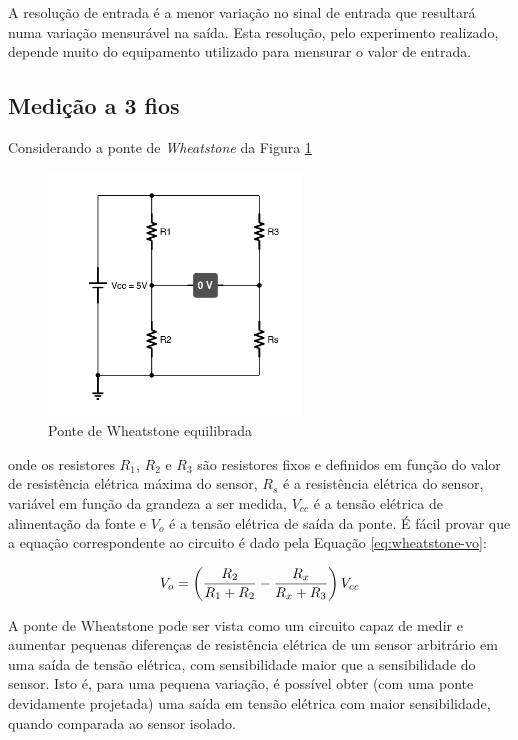 \documentclass[a4paper]{instrumentacao}
\begin{document}
A resolução de entrada é a menor variação no sinal de entrada que resultará numa variação mensurável na saída.  Esta resolução, pelo experimento realizado, depende muito do equipamento utilizado para mensurar o valor de entrada.


\subsection{Medição a 3 fios}

Considerando a ponte de \textit{Wheatstone} da Figura \ref{fig:3fios-wheatstone}

\begin{figure}[H]
\centering
\includegraphics[width=0.6\textwidth]{Wheatstone-Bridge.pdf}
\caption{Ponte de Wheatstone equilibrada}
\label{fig:3fios-wheatstone}
\end{figure}

\noindent onde os resistores $R_1$, $R_2$ e $R_3$ são resistores fixos e definidos em função do valor de resistência elétrica máxima do sensor, $R_s$ é a resistência elétrica do sensor, variável em função da grandeza a ser medida, $V_{cc}$ é a tensão elétrica de alimentação da fonte e $V_o$ é a tensão elétrica de saída da ponte. É fácil provar que a equação correspondente ao circuito é dado pela Equação \ref{eq:wheatstone-vo}:

\begin{equation}
	V_o = \left({{R_2}\over{R_1 + R_2}} - {{R_x}\over{R_x + R_3}}\right)V_{cc}
	\label{eq:wheatstone-vo}
\end{equation}

A ponte de Wheatstone pode ser vista como um circuito capaz de medir e aumentar pequenas diferenças de resistência elétrica de um sensor arbitrário em uma saída de tensão elétrica, com sensibilidade maior que a sensibilidade do sensor. Isto é, para uma pequena variação, é possível obter (com uma ponte devidamente projetada) uma saída em tensão elétrica com maior sensibilidade, quando comparada ao sensor isolado.
\end{document}

